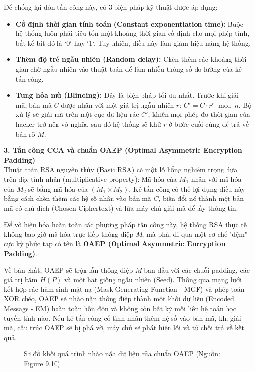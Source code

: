 Để chống lại đòn tấn công này, có 3 biện pháp kỹ thuật được áp dụng:
\begin{itemize}
    \item \textbf{Cố định thời gian tính toán (Constant exponentiation time):} Buộc hệ thống luôn phải tiêu tốn một khoảng thời gian cố định cho mọi phép tính, bất kể bit đó là `0` hay `1`. Tuy nhiên, điều này làm giảm hiệu năng hệ thống.
    \item \textbf{Thêm độ trễ ngẫu nhiên (Random delay):} Chèn thêm các khoảng thời gian chờ ngẫu nhiên vào thuật toán để làm nhiễu thông số đo lường của kẻ tấn công.
    \item \textbf{Tung hỏa mù (Blinding):} Đây là biện pháp tối ưu nhất. Trước khi giải mã, bản mã $C$ được nhân với một giá trị ngẫu nhiên $r$: $C' = C \cdot r^e \bmod n$. Bộ xử lý sẽ giải mã trên một cục dữ liệu rác $C'$, khiến mọi phép đo thời gian của hacker trở nên vô nghĩa, sau đó hệ thống sẽ khử $r$ ở bước cuối cùng để trả về bản rõ $M$.
\end{itemize}

\textbf{3. Tấn công CCA và chuẩn OAEP (Optimal Asymmetric Encryption Padding)} \\
Thuật toán RSA nguyên thủy (Basic RSA) có một lỗ hổng nghiêm trọng dựa trên đặc tính nhân (multiplicative property): Mã hóa của $M_1$ nhân với mã hóa của $M_2$ sẽ bằng mã hóa của $(M_1 \times M_2)$. Kẻ tấn công có thể lợi dụng điều này bằng cách chèn thêm các hệ số nhân vào bản mã $C$, biến đổi nó thành một bản mã có chủ đích (Chosen Ciphertext) và lừa máy chủ giải mã để lấy thông tin.

Để vô hiệu hóa hoàn toàn các phương pháp tấn công này, hệ thống RSA thực tế không bao giờ mã hóa trực tiếp thông điệp $M$, mà phải đi qua một cơ chế "đệm" cực kỳ phức tạp có tên là \textbf{OAEP (Optimal Asymmetric Encryption Padding)}.

Về bản chất, OAEP sẽ trộn lẫn thông điệp $M$ ban đầu với các chuỗi padding, các giá trị băm $H(P)$ và một hạt giống ngẫu nhiên (Seed). Thông qua mạng lưới kết hợp các hàm sinh mặt nạ (Mask Generating Function - MGF) và phép toán XOR chéo, OAEP sẽ nhào nặn thông điệp thành một khối dữ liệu (Encoded Message - EM) hoàn toàn hỗn độn và không còn bất kỳ mối liên hệ toán học tuyến tính nào. Nếu kẻ tấn công cố tình nhân thêm hệ số vào bản mã, khi giải mã, cấu trúc OAEP sẽ bị phá vỡ, máy chủ sẽ phát hiện lỗi và từ chối trả về kết quả.

\begin{figure}[htbp]
    \centering
    \caption{Sơ đồ khối quá trình nhào nặn dữ liệu của chuẩn OAEP (Nguồn: Figure 9.10)}
    \label{fig:rsa_oaep}
\end{figure}

